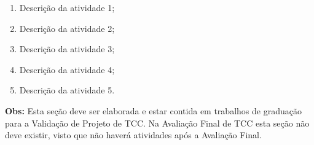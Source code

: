 \documentclass[
	article,
	11pt,
	oneside,
	a4paper,
	chapter=TITLE,
	section=TITLE,
	english,
	brazil,
	sumario=tradicional
]{abntex2}
\begin{document}
	\begin{enumerate}
		\item Descrição da atividade 1;
		\item Descrição da atividade 2;
		\item Descrição da atividade 3;
		\item Descrição da atividade 4;
		\item Descrição da atividade 5.
	\end{enumerate}
	
	\textbf{Obs:} Esta seção deve ser elaborada e estar contida em trabalhos de graduação para a Validação de Projeto de TCC. Na Avaliação Final de TCC esta seção não deve existir, visto que não haverá atividades após a Avaliação Final.
	
	
	\postextual
	
	
	\begin{folhadeaprovacao}
		
	\end{folhadeaprovacao}
\end{document}
